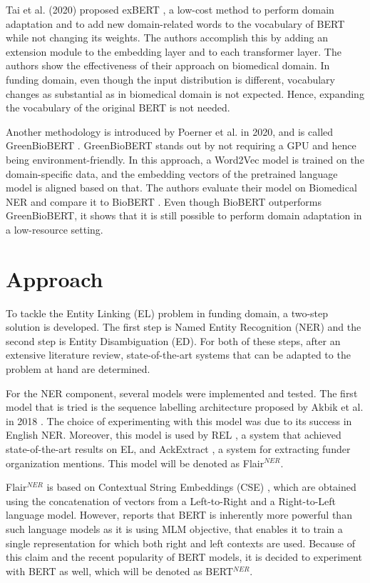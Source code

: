 \documentclass{report}
\theoremstyle{definition}
\theoremstyle{remark}
\begin{document}
Tai et al. (2020) proposed exBERT \cite{exBERT}, a low-cost method to perform domain adaptation and to add new domain-related words to the vocabulary of BERT while not changing its weights. The authors accomplish this by adding an extension module to the embedding layer and to each transformer layer. The authors show the effectiveness of their approach on biomedical domain. In funding domain, even though the input distribution is different, vocabulary changes as substantial as in biomedical domain is not expected. Hence, expanding the vocabulary of the original BERT is not needed. 

Another methodology is introduced by Poerner et al.  in 2020, and is called GreenBioBERT \cite{word2vectoBERT}. GreenBioBERT stands out by not requiring a GPU and hence being environment-friendly. In this approach, a Word2Vec model is trained on the domain-specific data, and the embedding vectors of the pretrained language model is aligned based on that. The authors evaluate their model on Biomedical NER and compare it to BioBERT \cite{biobert}. Even though BioBERT outperforms GreenBioBERT, it shows that it is still possible to perform domain adaptation in a low-resource setting.



\newpage
\chapter{Approach}
\label{chapter:Approach}
To tackle the Entity Linking (EL) problem in funding domain, a two-step solution is developed. The first step is Named Entity Recognition (NER) and the second step is Entity Disambiguation (ED). For both of these steps, after an extensive literature review, state-of-the-art systems that can be adapted to the problem at hand are determined.

For the NER component, several models were implemented and tested. The first model that is tried is the sequence labelling architecture proposed by Akbik et al. in 2018 \cite{flairpaper}. The choice of experimenting with this model was due to its success in English NER. Moreover, this model is used by REL \cite{REL}, a system that achieved state-of-the-art results on EL, and AckExtract \cite{AckExtract}, a system for extracting funder organization mentions. This model will be denoted as Flair$^{NER}$.

Flair$^{NER}$ is based on Contextual String Embeddings (CSE) \cite{flairpaper}, which are obtained using the concatenation of vectors from a Left-to-Right and a Right-to-Left language model. However, \cite{BERT} reports that BERT is inherently more powerful than such language models as it is using MLM objective, that enables it to train a single representation for which both right and left contexts are used. Because of this claim and the recent popularity of BERT models, it is decided to experiment with BERT as well, which will be denoted as BERT$^{NER}$. 
\end{document}
